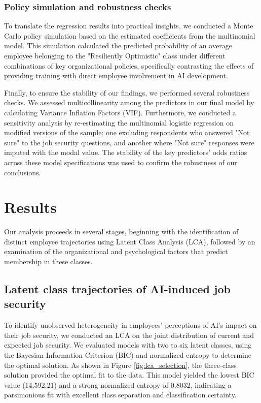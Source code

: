 \documentclass[]{article}
\begin{document}
\subsubsection{Policy simulation and robustness checks}
To translate the regression results into practical insights, we conducted a Monte Carlo policy simulation based on the estimated coefficients from the multinomial model. This simulation calculated the predicted probability of an average employee belonging to the "Resiliently Optimistic" class under different combinations of key organizational policies, specifically contrasting the effects of providing training with direct employee involvement in AI development.

Finally, to ensure the stability of our findings, we performed several robustness checks. We assessed multicollinearity among the predictors in our final model by calculating Variance Inflation Factors (VIF). Furthermore, we conducted a sensitivity analysis by re-estimating the multinomial logistic regression on modified versions of the sample: one excluding respondents who answered "Not sure" to the job security questions, and another where "Not sure" responses were imputed with the modal value. The stability of the key predictors' odds ratios across these model specifications was used to confirm the robustness of our conclusions.

\section{Results}
\label{sec:results}
Our analysis proceeds in several stages, beginning with the identification of distinct employee trajectories using Latent Class Analysis (LCA), followed by an examination of the organizational and psychological factors that predict membership in these classes.

\subsection{Latent class trajectories of AI-induced job security}
To identify unobserved heterogeneity in employees' perceptions of AI's impact on their job security, we conducted an LCA on the joint distribution of current and expected job security. We evaluated models with two to six latent classes, using the Bayesian Information Criterion (BIC) and normalized entropy to determine the optimal solution. As shown in Figure \ref{fig:lca_selection}, the three-class solution provided the optimal fit to the data. This model yielded the lowest BIC value (14,592.21) and a strong normalized entropy of 0.8032, indicating a parsimonious fit with excellent class separation and classification certainty.
\end{document}
